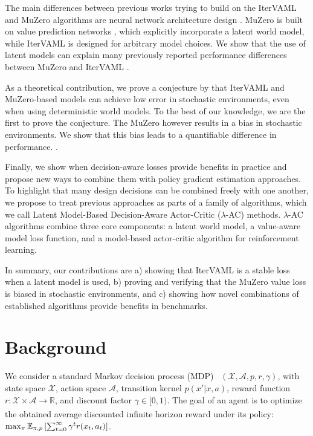 The main differences between previous works trying to build on the IterVAML and MuZero algorithms are neural network architecture design .
MuZero is built on value prediction networks \parencite{oh2017value}, which explicitly incorporate a latent world model, while IterVAML is designed for arbitrary model choices.
We show that the use of latent models can explain many previously reported performance differences between MuZero and IterVAML \parencite{voelcker2022value,lovatto2020decision}.

As a theoretical contribution, we prove a conjecture by \textcite{oh2017value} that IterVAML and MuZero-based models can achieve low error in stochastic environments, even when using deterministic world models.
To the best of our knowledge, we are the first to prove the conjecture.
The MuZero  however results in a bias in stochastic environments.
We show that this bias leads to a quantifiable difference in performance.
.

Finally, we show when decision-aware losses provide benefits in practice and propose new ways to combine them with policy gradient estimation approaches.
To highlight that many design decisions can be combined freely with one another, we propose to treat previous approaches as parts of a family of algorithms, which we call Latent Model-Based Decision-Aware Actor-Critic ($\lambda$-AC) methods.
$\lambda$-AC algorithms combine three core components: a latent world model, a value-aware model loss function, and a model-based actor-critic algorithm for reinforcement learning.

In summary, our contributions are a) showing that IterVAML is a stable loss when a latent model is used, b) proving and verifying that the MuZero value loss is biased in stochastic environments, and c) showing how novel combinations of established algorithms provide benefits in benchmarks.

\section{Background}
We consider a standard Markov decision process (MDP)~\parencite{Puterman1994MarkovDP,suttonbook} $(\mathcal{X}, \mathcal{A}, p, r, \gamma)$, with state space $\mathcal{X}$, action space $\mathcal{A}$, transition kernel $p(x'|x,a)$, reward function $r: \mathcal{X} \times \mathcal{A} \xrightarrow[]{} \mathbb{R}$, and discount factor $\gamma \in [0,1)$.
The goal of an agent is to optimize the obtained average discounted infinite horizon reward under its policy: $\max_\pi \mathbb{E}_{\pi,p}\left[ \sum_{t=0}^{\infty} \gamma^t r(x_t, a_t) \right]$.

